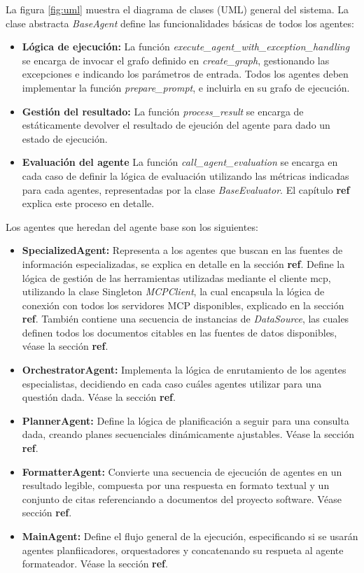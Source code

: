 La figura \ref{fig:uml} muestra el diagrama de clases (UML) general del sistema. La clase abstracta \textit{BaseAgent} define las funcionalidades básicas de todos los agentes: 
\begin{itemize}
  \item\textbf{Lógica de ejecución: }La función \textit{execute\_agent\_with\_exception\_handling} se encarga de invocar el grafo definido en \textit{create\_graph}, gestionando las excepciones e indicando los parámetros de entrada. Todos los agentes deben implementar la función \textit{prepare\_prompt}, e incluirla en su grafo de ejecución.
  \item\textbf{Gestión del resultado: }La función \textit{process\_result} se encarga de estáticamente devolver el resultado de ejeución del agente para dado un estado de ejecución. 
  \item\textbf{Evaluación del agente }La función \textit{call\_agent\_evaluation} se encarga en cada caso de definir la lógica de evaluación utilizando las métricas indicadas para cada agentes, representadas por la clase \textit{BaseEvaluator}. El capítulo \textbf{ref} explica este proceso en detalle.
\end{itemize}


Los agentes que heredan del agente base son los siguientes:
\begin{itemize}
  \item\textbf{SpecializedAgent: }Representa a los agentes que buscan en las fuentes de información especializadas, se explica en detalle en la sección \textbf{ref}. Define la lógica de gestión de las herramientas utilizadas mediante el cliente mcp, utilizando la clase Singleton \textit{MCPClient}, la cual encapsula la lógica de conexión con todos los servidores MCP disponibles, explicado en la sección \textbf{ref}. También contiene una secuencia de instancias de \textit{DataSource}, las cuales definen todos los documentos citables en las fuentes de datos disponibles, véase la sección \textbf{ref}.
  \item\textbf{OrchestratorAgent: }Implementa la lógica de enrutamiento de los agentes especialistas, decidiendo en cada caso cuáles agentes utilizar para una questión dada. Véase la sección \textbf{ref}. 
  \item\textbf{PlannerAgent: }Define la lógica de planificación a seguir para una consulta dada, creando planes secuenciales dinámicamente ajustables. Véase la sección \textbf{ref}.
  \item\textbf{FormatterAgent: }Convierte una secuencia de ejecución de agentes en un resultado legible, compuesta por una respuesta en formato textual y un conjunto de citas referenciando a documentos del proyecto software. Véase sección \textbf{ref}.
  \item\textbf{MainAgent: }Define el flujo general de la ejecución, especificando si se usarán agentes planfiicadores, orquestadores y concatenando su respueta al agente formateador. Véase la sección \textbf{ref}. 
\end{itemize}

